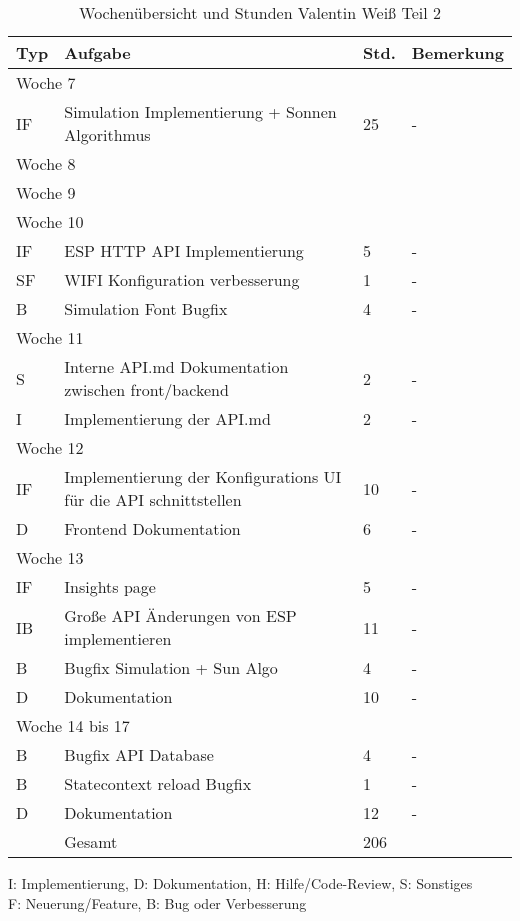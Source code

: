 \vspace{1em}
\begin{table}[!hp]
    \begin{center}
    \begin{tabular}{|p{0.8cm}|p{6cm}|p{0.8cm}|p{8cm}|} \hline
        \textbf{Typ} & \textbf{Aufgabe} & \textbf{Std.} & \textbf{Bemerkung} \\ \hline
        \multicolumn{4}{|l|}{Woche 7}      \\ \hline
        IF & Simulation Implementierung + Sonnen Algorithmus & 25 & - \\\hline
        \multicolumn{4}{|l|}{Woche 8}             \\ \hline
        \multicolumn{4}{|l|}{Woche 9}                                                \\ \hline
        \multicolumn{4}{|l|}{Woche 10}                 \\ \hline
        IF & ESP HTTP API Implementierung        & 5 & -\\
        SF & WIFI Konfiguration verbesserung                & 1 & -\\
        B & Simulation Font Bugfix & 4 & -\\\hline
        \multicolumn{4}{|l|}{Woche 11}      \\ \hline
        S & Interne API.md Dokumentation zwischen front/backend & 2 & -\\
        I & Implementierung der API.md & 2 & -\\ \hline
        \multicolumn{4}{|l|}{Woche 12}           \\ \hline
        IF & Implementierung der Konfigurations UI für die API schnittstellen & 10 & - \\
        D & Frontend Dokumentation & 6 & - \\\hline
        \multicolumn{4}{|l|}{Woche 13}     \\ \hline
        IF & Insights page  & 5 & - \\
        IB & Große API Änderungen von ESP implementieren & 11 & -\\
        B & Bugfix Simulation + Sun Algo & 4 & -\\
        D & Dokumentation & 10 & -\\\hline
        \multicolumn{4}{|l|}{Woche 14 bis 17}     \\ \hline
        B & Bugfix API Database & 4 & -\\
        B & Statecontext reload Bugfix & 1 &-\\
        D & Dokumentation & 12 & -\\
        \Xhline{3\arrayrulewidth}
        & Gesamt & 206 & \\ \hline
    \end{tabular}
    \end{center}
    \caption{Wochenübersicht und Stunden Valentin Weiß Teil 2}
    I: Implementierung, D: Dokumentation, H: Hilfe/Code-Review, S: Sonstiges\\
        F: Neuerung/Feature, B: Bug oder Verbesserung
\end{table}
\vspace{1em}

\newpage
